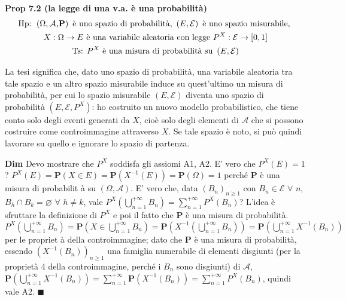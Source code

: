 \documentclass{article}
\begin{document}
\textbf{Prop 7.2 (la legge di una v.a. \`{e} una probabilit\`{a})}%
\begin{gather*}
\text{Hp}\text{: }\left( \Omega ,\mathcal{A}\emph{,}\mathbf{P}\right) \text{ 
\`{e} uno spazio di probabilit\`{a}, }\left( E,\mathcal{E}\right) \text{ 
\`{e} uno spazio misurabile, } \\
X:\Omega \rightarrow E\text{ \`{e} una variabile aleatoria con legge }P^{X}:%
\mathcal{E}\rightarrow \left[ 0,1\right] \\
\text{Ts}\text{: }P^{X}\text{ \`{e} una misura di probabilit\`{a} su }\left(
E,\mathcal{E}\right)
\end{gather*}

La tesi significa che, dato uno spazio di probabilit\`{a}, una variabile
aleatoria tra tale spazio e un altro spazio misurabile induce su
quest'ultimo un misura di probabilit\`{a}, per cui lo spazio misurabile $%
\left( E,\mathcal{E}\right) $ diventa uno spazio di probabilit\`{a} $\left(
E,\mathcal{E},P^{X}\right) $: ho costruito un nuovo modello probabilistico,
che tiene conto solo degli eventi generati da $X$, cio\`{e} solo degli
elementi di $\mathcal{A}$ che si possono costruire come controimmagine
attraverso $X$. Se tale spazio \`{e} noto, si pu\`{o} quindi lavorare su
quello e ignorare lo spazio di partenza.

\textbf{Dim} Devo mostrare che $P^{X}$ soddisfa gli assiomi A1, A2. E' vero
che $P^{X}\left( E\right) =1$? $P^{X}\left( E\right) =\mathbf{P}\left( X\in
E\right) =\mathbf{P}\left( X^{-1}\left( E\right) \right) =\mathbf{P}\left(
\Omega \right) =1$ perch\'{e} $\mathbf{P}$ \`{e} una misura di probabilit%
\`{a} su $\left( \Omega ,\mathcal{A}\right) $. E' vero che, data $\left(
B_{n}\right) _{n\geq 1}$ con $B_{n}\in \mathcal{E}$ $\forall $ $n$, $%
B_{h}\cap B_{k}=\varnothing $ $\forall $ $h\neq k$, vale $P^{X}\left(
\bigcup_{n=1}^{+\infty }B_{n}\right) =\sum_{n=1}^{+\infty }P^{X}\left(
B_{n}\right) $? L'idea \`{e} sfruttare la definizione di $P^{X}$ e poi il
fatto che $\mathbf{P}$ \`{e} una misura di probabilit\`{a}. $P^{X}\left(
\bigcup_{n=1}^{+\infty }B_{n}\right) =\mathbf{P}\left( X\in
\bigcup_{n=1}^{+\infty }B_{n}\right) =\mathbf{P}\left( X^{-1}\left(
\bigcup_{n=1}^{+\infty }B_{n}\right) \right) =\mathbf{P}\left(
\bigcup_{n=1}^{+\infty }X^{-1}\left( B_{n}\right) \right) $ per le propriet%
\`{a} della controimmagine; dato che $\mathbf{P}$ \`{e} una misura di
probabilit\`{a}, essendo $\left( X^{-1}\left( B_{n}\right) \right) _{n\geq
1} $ una famiglia numerabile di elementi disgiunti (per la propriet\`{a} 4
della controimmagine, perch\'{e} i $B_{n}$ sono disgiunti) di $\mathcal{A}$, 
$\mathbf{P}\left( \bigcup_{n=1}^{+\infty }X^{-1}\left( B_{n}\right) \right)
=\sum_{n=1}^{+\infty }\mathbf{P}\left( X^{-1}\left( B_{n}\right) \right)
=\sum_{n=1}^{+\infty }P^{X}\left( B_{n}\right) $, quindi vale A2. $%
\blacksquare $
\end{document}

